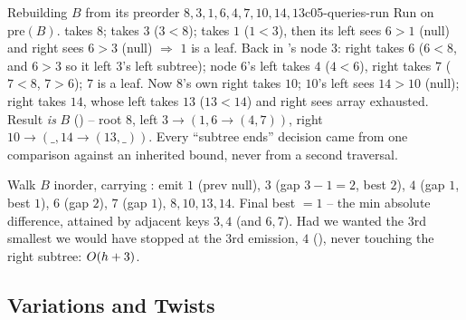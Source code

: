 \begin{example}{Rebuilding $B$ from its preorder $8,3,1,6,4,7,10,14,13$}{c05-queries-run}
Run  on $\mathrm{pre}(B)$.  takes $8$;  takes $3$
($3<8$);  takes $1$ ($1<3$), then its left  sees $6>1$ (null) and right
 sees $6>3$ (null) $\Rightarrow$ $1$ is a leaf. Back in 's node $3$:
right  takes $6$ ($6<8$, and $6>3$ so it left $3$'s left subtree); node $6$'s left
 takes $4$ ($4<6$), right  takes $7$ ($7<8$, $7>6$); $7$ is a leaf. Now
$8$'s own right  takes $10$; $10$'s left  sees $14>10$ (null); right
 takes $14$, whose left  takes $13$ ($13<14$) and right sees array
exhausted. Result \emph{is} $B$ () -- root $8$, left $3\!\to\!(1,6\!\to\!(4,7))$,
right $10\!\to\!(\_,14\!\to\!(13,\_))$. Every ``subtree ends'' decision came from one comparison
against an inherited bound, never from a second traversal.
\end{example}
\begin{tracebox}
Walk $B$ inorder, carrying : emit $1$ (prev null), $3$ (gap $3-1=2$, best $2$), $4$ (gap
$1$, best $1$), $6$ (gap $2$), $7$ (gap $1$), $8,10,13,14$. Final best $=1$ -- the min absolute
difference, attained by adjacent keys $3,4$ (and $6,7$). Had we wanted the $3$rd smallest we would
have stopped at the $3$rd emission, $4$ (), never touching the right subtree: $O(h+3)$.
\end{tracebox}

\subsection{Variations and Twists}

